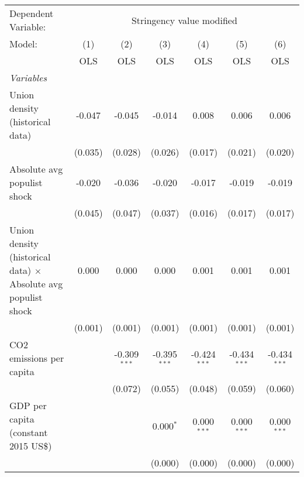 
\begingroup
\centering
\begin{tabular}{lcccccc}
   \toprule
   Dependent Variable: & \multicolumn{6}{c}{Stringency value modified}\\
   Model:                                                                & (1)     & (2)            & (3)            & (4)            & (5)            & (6)\\  
                                                                         &  OLS    & OLS            & OLS            & OLS            & OLS            & OLS\\  
   \midrule
   \emph{Variables}\\
   Union density (historical data)                                       & -0.047  & -0.045         & -0.014         & 0.008          & 0.006          & 0.006\\   
                                                                         & (0.035) & (0.028)        & (0.026)        & (0.017)        & (0.021)        & (0.020)\\   
   Absolute avg populist shock                                           & -0.020  & -0.036         & -0.020         & -0.017         & -0.019         & -0.019\\   
                                                                         & (0.045) & (0.047)        & (0.037)        & (0.016)        & (0.017)        & (0.017)\\   
   Union density (historical data) $\times$ Absolute avg populist shock  & 0.000   & 0.000          & 0.000          & 0.001          & 0.001          & 0.001\\   
                                                                         & (0.001) & (0.001)        & (0.001)        & (0.001)        & (0.001)        & (0.001)\\   
   CO2 emissions per capita                                              &         & -0.309$^{***}$ & -0.395$^{***}$ & -0.424$^{***}$ & -0.434$^{***}$ & -0.434$^{***}$\\   
                                                                         &         & (0.072)        & (0.055)        & (0.048)        & (0.059)        & (0.060)\\   
   GDP per capita (constant 2015 US\$)                                   &         &                & 0.000$^{*}$    & 0.000$^{***}$  & 0.000$^{***}$  & 0.000$^{***}$\\   
                                                                         &         &                & (0.000)        & (0.000)        & (0.000)        & (0.000)\\   

\end{tabular}
